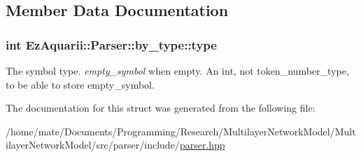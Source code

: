 \subsection{Member Data Documentation}
\subsubsection[{\texorpdfstring{type}{type}}]{\setlength{\rightskip}{0pt plus 5cm}int Ez\+Aquarii\+::\+Parser\+::by\+\_\+type\+::type}\hypertarget{structEzAquarii_1_1Parser_1_1by__type_ace551e79e70eb0e2237dbab411f478a8}{}\label{structEzAquarii_1_1Parser_1_1by__type_ace551e79e70eb0e2237dbab411f478a8}
The symbol type. {\itshape empty\+\_\+symbol} when empty. An int, not token\+\_\+number\+\_\+type, to be able to store empty\+\_\+symbol. 

The documentation for this struct was generated from the following file\+:\begin{DoxyCompactItemize}
\item 
/home/mate/\+Documents/\+Programming/\+Research/\+Multilayer\+Network\+Model/\+Multilayer\+Network\+Model/src/parser/include/\hyperlink{parser_8hpp}{parser.\+hpp}\end{DoxyCompactItemize}

